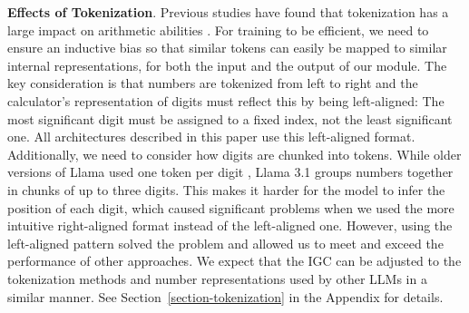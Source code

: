 \documentclass[11pt]{article}
\begin{document}
\textbf{Effects of Tokenization}.
Previous studies have found that tokenization has a large impact on arithmetic abilities \citep{kim2021have,ding2022delta,liu2023goatfinetunedllamaoutperforms,tweet2024garrethlee}.
For training to be efficient, we need to ensure an inductive bias so that similar tokens can easily be mapped to similar internal representations, for both the input and the output of our module.
The key consideration is that numbers are tokenized from left to right and the calculator's representation of digits must reflect this by being left-aligned: The most significant digit must be assigned to a fixed index, not the least significant one.
All architectures described in this paper use this left-aligned format.
Additionally, we need to consider how digits are chunked into tokens.
While older versions of Llama used one token per digit \citep{yuan2023well,liu2023goatfinetunedllamaoutperforms}, Llama 3.1 \citep{dubey2024llama} groups numbers together in chunks of up to three digits.
This makes it harder for the model to infer the position of each digit, which caused significant problems when we used the more intuitive right-aligned format instead of the left-aligned one.
However, using the left-aligned pattern solved the problem and allowed us to meet and exceed the performance of other approaches.
We expect that the IGC can be adjusted to the tokenization methods and number representations used by other LLMs in a similar manner.
See Section~\ref{section-tokenization} in the Appendix for details.
\end{document}
